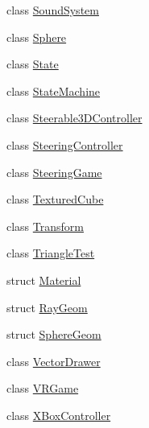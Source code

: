 \begin{DoxyCompactItemize}
class \hyperlink{class_b_g_e_1_1_sound_system}{Sound\-System}
\item 
class \hyperlink{class_b_g_e_1_1_sphere}{Sphere}
\item 
class \hyperlink{class_b_g_e_1_1_state}{State}
\item 
class \hyperlink{class_b_g_e_1_1_state_machine}{State\-Machine}
\item 
class \hyperlink{class_b_g_e_1_1_steerable3_d_controller}{Steerable3\-D\-Controller}
\item 
class \hyperlink{class_b_g_e_1_1_steering_controller}{Steering\-Controller}
\item 
class \hyperlink{class_b_g_e_1_1_steering_game}{Steering\-Game}
\item 
class \hyperlink{class_b_g_e_1_1_textured_cube}{Textured\-Cube}
\item 
class \hyperlink{class_b_g_e_1_1_transform}{Transform}
\item 
class \hyperlink{class_b_g_e_1_1_triangle_test}{Triangle\-Test}
\item 
struct \hyperlink{struct_b_g_e_1_1_material}{Material}
\item 
struct \hyperlink{struct_b_g_e_1_1_ray_geom}{Ray\-Geom}
\item 
struct \hyperlink{struct_b_g_e_1_1_sphere_geom}{Sphere\-Geom}
\item 
class \hyperlink{class_b_g_e_1_1_vector_drawer}{Vector\-Drawer}
\item 
class \hyperlink{class_b_g_e_1_1_v_r_game}{V\-R\-Game}
\item 
class \hyperlink{class_b_g_e_1_1_x_box_controller}{X\-Box\-Controller}
\end{DoxyCompactItemize}
